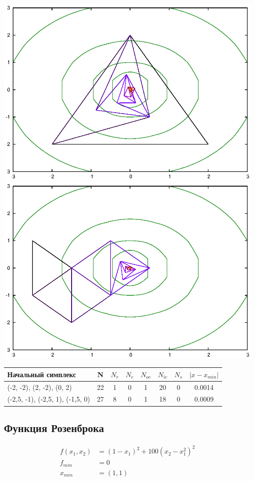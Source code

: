 \documentclass[12pt]{article}
\theoremstyle{plain}
\theoremstyle{remark}
\theoremstyle{definition}
\begin{document}
 \noindent
\includegraphics[scale=0.6]{sphere1.eps}
\includegraphics[scale=0.6]{sphere2.eps}


\begin{tabular}{|l| c| c| c| c| c| c| c|}
\hline
  Начальный симплекс &N & $N_r$ & $N_e$ & $N_{oc}$ & $N_{ic}$ & $N_s$ & $\left| x - x_{min} \right|$ \\
\hline
 (-2, -2), (2, -2), (0, 2) & 22 & 1 & 0 & 1 & 20& 0 & 0.0014 \\
(-2,5, -1), (-2,5, 1), (-1,5, 0) & 27  &8 & 0 & 1 & 18 & 0 &0.0009 \\
\hline
\end{tabular}

\subsection{Функция Розенброка}
\vspace{-0.6cm}
\begin{align*}
f(x_1, x_2) &= (1 - x_1) ^ 2 + 100(x_2 - x_1^2)^2 \\
f_{min} &= 0 \\
x_{min} &= (1, 1)
\end{align*}
\end{document}
